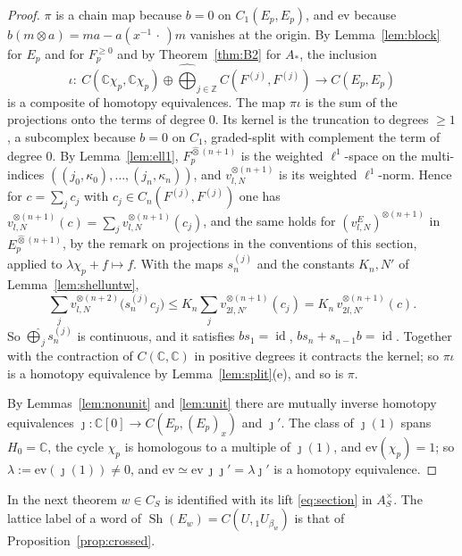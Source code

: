 \documentclass[11pt]{amsart}
\theoremstyle{definition}
\theoremstyle{remark}
\newcommand{\C}{\mathbb C}
\newcommand{\Z}{\mathbb Z}
\newcommand{\id}{\operatorname{id}}
\newcommand{\Sh}{\operatorname{Sh}}
\begin{document}
\begin{proof}
$\pi$ is a chain map because $b=0$ on $C_1(E_p,E_p)$, and $\mathrm{ev}$ because
$b(m\otimes a)=ma-a(x^{-1}\,\cdot\,)m$ vanishes at the origin.  By
Lemma~\ref{lem:block} for $E_p$ and for $F_p^{\ge0}$ and by
Theorem~\ref{thm:B2} for $A_*$, the inclusion
\[
\iota:\ C(\C\chi_p,\C\chi_p)\oplus\widehat\bigoplus_{j\in\Z}C(F^{(j)},F^{(j)})
\longrightarrow C(E_p,E_p)
\]
is a composite of homotopy equivalences.  The map $\pi\iota$ is the sum of the
projections onto the terms of degree $0$.  Its kernel is the truncation to
degrees $\ge1$, a subcomplex because $b=0$ on $C_1$, graded-split with
complement the term of degree $0$.  By Lemma~\ref{lem:ell1},
$F_p^{\widehat\otimes(n+1)}$ is the weighted $\ell^{1}$-space on the
multi-indices $((j_0,\kappa_0),\dots,(j_n,\kappa_n))$, and
$v_{l,N}^{\otimes(n+1)}$ is its weighted $\ell^{1}$-norm.  Hence for
$c=\sum_jc_j$ with $c_j\in C_n(F^{(j)},F^{(j)})$ one has
$v_{l,N}^{\otimes(n+1)}(c)=\sum_jv_{l,N}^{\otimes(n+1)}(c_j)$, and the same holds
for $(v^{E}_{l,N})^{\otimes(n+1)}$ in $E_p^{\widehat\otimes(n+1)}$, by the
remark on projections in the conventions of this section, applied to
$\lambda\chi_p+f\mapsto f$.  With the maps $s_n^{(j)}$ and the constants $K_n,N'$ of
Lemma~\ref{lem:shelluntw},
\[
\sum_jv_{l,N}^{\otimes(n+2)}\bigl(s_n^{(j)}c_j\bigr)\le
K_n\sum_jv_{2l,N'}^{\otimes(n+1)}(c_j)=K_n\,v_{2l,N'}^{\otimes(n+1)}(c).
\]
So $\widehat\bigoplus_js_n^{(j)}$ is continuous, and it satisfies $bs_1=\id$,
$bs_n+s_{n-1}b=\id$.  Together with the contraction of $C(\C,\C)$ in positive
degrees it contracts the kernel; so $\pi\iota$ is a homotopy equivalence by
Lemma~\ref{lem:split}(e), and so is $\pi$.

By Lemmas~\ref{lem:nonunit} and \ref{lem:unit} there are mutually inverse
homotopy equivalences $\jmath:\C[0]\to C(E_p,(E_p)_x)$ and $\jmath'$.  The
class of $\jmath(1)$ spans $H_0=\C$, the cycle $\chi_p$ is homologous to a
multiple of $\jmath(1)$, and $\mathrm{ev}(\chi_p)=1$; so
$\lambda:=\mathrm{ev}(\jmath(1))\ne0$, and
$\mathrm{ev}\simeq\mathrm{ev}\,\jmath\jmath'=\lambda\jmath'$ is a homotopy
equivalence.
\end{proof}

In the next theorem $w\in C_S$ is identified with its lift \eqref{eq:section}
in $A_S^{\times}$.  The
lattice label of a word of $\Sh(E_w)=C(U,{}_{1}U_{\beta_w})$ is that of
Proposition~\ref{prop:crossed}.
\end{document}
